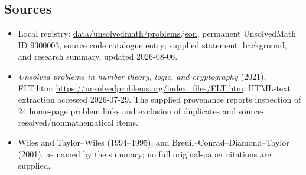 \documentclass[11pt]{article}
\begin{document}
\subsection{Sources}
\begin{itemize}
\item Local registry: \url{data/unsolvedmath/problems.json}, permanent UnsolvedMath ID \(9300003\), source code catalogue entry; supplied statement, background, and research summary, updated 2026-08-06.
\item \emph{Unsolved problems in number theory, logic, and cryptography} (2021), FLT.htm: \url{https://unsolvedproblems.org/index_files/FLT.htm}. HTML-text extraction accessed 2026-07-29. The supplied provenance reports inspection of 24 home-page problem links and exclusion of duplicates and source-resolved/nonmathematical items.
\item Wiles and Taylor--Wiles (1994--1995), and Breuil--Conrad--Diamond--Taylor (2001), as named by the summary; no full original-paper citations are supplied.
\end{itemize}
\end{document}
